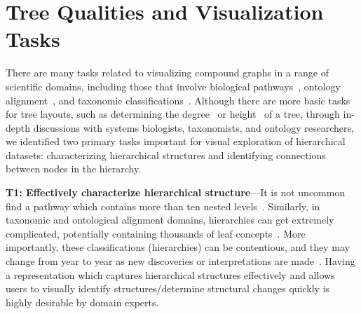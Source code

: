 \documentclass[a4paper]{llncs}
\begin{document}
\section{Tree Qualities and Visualization Tasks}
\label{Sec:TheTasks}
There are many tasks related to visualizing compound graphs in a range of scientific domains, including those that involve biological pathways~\cite{Entourage2013}, ontology alignment~\cite{Nasir2013OntologyAlignment}, and taxonomic classifications~\cite{dang2015provenancematrix}. Although there are more basic tasks for tree layouts, such as determining the degree~\cite{Lee:2006TaskTaxonomy} or height~\cite{Wang:2006EvaluatingTree,Kobsa2004UserExperiments} of a tree, through in-depth discussions with systems biologists, taxonomists, and ontology researchers, we identified two primary tasks important for visual exploration of hierarchical datasets: characterizing hierarchical structures and identifying connections between nodes in the hierarchy.



\noindent \textbf{T1: Effectively characterize hierarchical structure}---It is not uncommon find a pathway which contains more than ten nested levels~\cite{stromback2005representations}. Similarly, in taxonomic and ontological alignment domains, hierarchies can get extremely complicated, potentially containing thousands of leaf concepts~\cite{dang2015provenancematrix,TaxonomicProvenance2014}. More importantly, these classifications (hierarchies) can be contentious, and they may change from year to year as new discoveries or interpretations are made~\cite{Hinchliff2015phylogeny}. Having a representation which captures hierarchical structures effectively and allows users to visually identify structures/determine structural changes quickly is highly desirable by domain experts.
\end{document}
